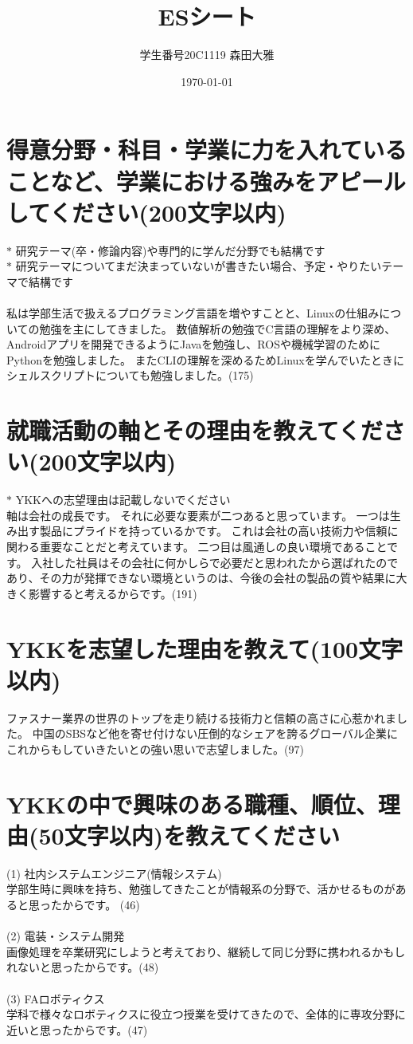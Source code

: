 \documentclass[platex,dvipdfmx]{jlreq}			%
\title{ESシート}
\author{学生番号20C1119 森田大雅}
\date{\today}
\begin{document}
\maketitle
\section{得意分野・科目・学業に力を入れていることなど、学業における強みをアピールしてください(200文字以内)}
\parindent=0pt
$\ast$ 研究テーマ(卒・修論内容)や専門的に学んだ分野でも結構です
\\
$\ast$ 研究テーマについてまだ決まっていないが書きたい場合、予定・やりたいテーマで結構です
\\
\\
私は学部生活で扱えるプログラミング言語を増やすことと、Linuxの仕組みについての勉強を主にしてきました。
数値解析の勉強でC言語の理解をより深め、Androidアプリを開発できるようにJavaを勉強し、ROSや機械学習のためにPythonを勉強しました。
またCLIの理解を深めるためLinuxを学んでいたときにシェルスクリプトについても勉強しました。(175)

\section{就職活動の軸とその理由を教えてください(200文字以内)}
\parindent=0pt
$\ast$ YKKへの志望理由は記載しないでください
\\
軸は会社の成長です。
それに必要な要素が二つあると思っています。
一つは生み出す製品にプライドを持っているかです。
これは会社の高い技術力や信頼に関わる重要なことだと考えています。
二つ目は風通しの良い環境であることです。
入社した社員はその会社に何かしらで必要だと思われたから選ばれたのであり、その力が発揮できない環境というのは、今後の会社の製品の質や結果に大きく影響すると考えるからです。(191)

\section{YKKを志望した理由を教えて(100文字以内)}
ファスナー業界の世界のトップを走り続ける技術力と信頼の高さに心惹かれました。
中国のSBSなど他を寄せ付けない圧倒的なシェアを誇るグローバル企業にこれからもしていきたいとの強い思いで志望しました。(97)

\section{YKKの中で興味のある職種、順位、理由(50文字以内)を教えてください}
\parindent=0pt
(1) 社内システムエンジニア(情報システム)
\\
学部生時に興味を持ち、勉強してきたことが情報系の分野で、活かせるものがあると思ったからです。
(46)
\\\\
(2) 電装・システム開発 
\\
画像処理を卒業研究にしようと考えており、継続して同じ分野に携われるかもしれないと思ったからです。(48)
\\\\
(3) FAロボティクス
\\
学科で様々なロボティクスに役立つ授業を受けてきたので、全体的に専攻分野に近いと思ったからです。(47)
\end{document}
